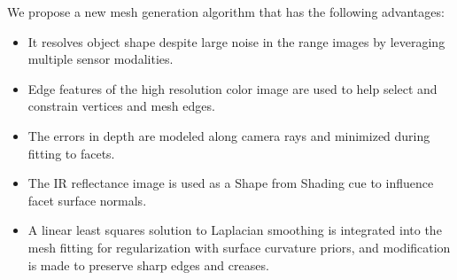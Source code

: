 
We propose a new mesh generation algorithm that has the following advantages:
\begin{itemize}
\item It resolves object shape despite large noise in the range images by leveraging multiple sensor modalities.  
\item Edge features of the high resolution color image are used to help select and constrain vertices and mesh edges.  
\item The errors in depth are modeled along camera rays and minimized during fitting to facets.  \item The IR reflectance image is used as a Shape from Shading cue to influence facet surface normals.  
\item A linear least squares solution to Laplacian smoothing is integrated into the mesh fitting for regularization with surface curvature priors, and modification is made to preserve sharp edges and creases.
\end{itemize}



